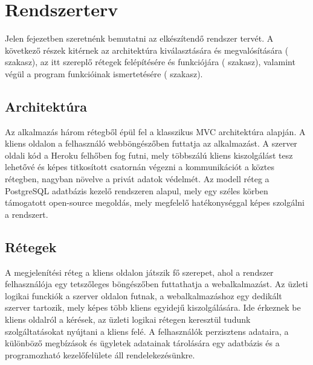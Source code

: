 \chapter{Rendszerterv}\label{sect:rszterv}

Jelen fejezetben szeretnénk bemutatni az elkészítendő rendszer tervét. A következő részek kitérnek az architektúra kiválasztására és megvalósítására ( szakasz), az itt szereplő rétegek felépítésére és funkciójára ( szakasz), valamint végül a program funkcióinak ismertetésére ( szakasz).

\section{Architektúra}\label{sect:architektura}


Az alkalmazás három rétegből épül fel a klasszikus MVC architektúra alapján. A kliens oldalon a felhasználó webböngészőben futtatja az alkalmazást. A szerver oldali kód a Heroku felhőben fog futni, mely többszálú kliens kiszolgálást tesz lehetővé és képes titkosított csatornán végezni a kommunikációt a köztes rétegben, nagyban növelve a privát adatok védelmét. Az modell réteg a PostgreSQL adatbázis kezelő rendszeren alapul, mely egy széles körben támogatott open-source megoldás, mely megfelelő hatékonységgal képes szolgálni a rendszert. 


\section{Rétegek}\label{sect:retegek}

 A megjelenítési réteg a kliens oldalon játszik fő szerepet, ahol a rendszer felhasználója egy tetszőleges böngészőben futtathatja a webalkalmazást. Az üzleti logikai funckiók a szerver oldalon futnak, a webalkalmazáshoz egy dedikált szerver tartozik, mely képes több kliens egyidejű kiszolgálására. Ide érkeznek be kliens oldalról a kérések, az üzleti logikai rétegen keresztül tudunk szolgáltatásokat nyújtani a kliens felé. A felhasználók perzisztens adataira, a különböző megbízások és ügyletek adatainak tárolására egy adatbázis és a programozható kezelőfelülete áll rendelekezésünkre.

